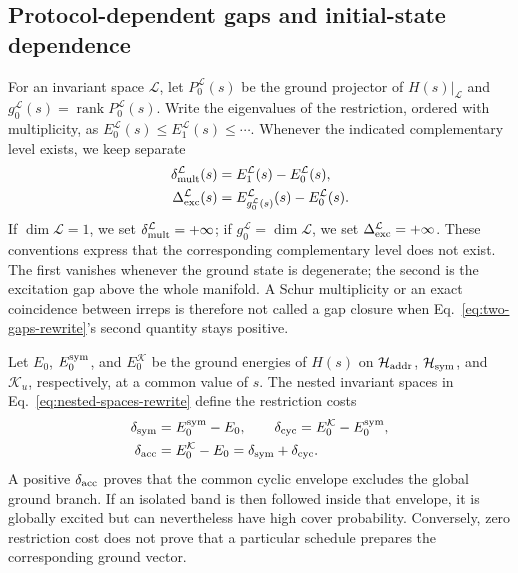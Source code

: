 \subsection{Protocol-dependent gaps and initial-state dependence}
\label{sec:rewrite-gaps}

For an invariant space $\mathcal L$, let $P_0^{\mathcal L}(s)$ be the
ground projector of $H(s)|_{\mathcal L}$ and
$g_0^{\mathcal L}(s)=\operatorname{rank}P_0^{\mathcal L}(s)$.  Write the
eigenvalues of the restriction, ordered with multiplicity, as
$E_0^{\mathcal L}(s)\leq E_1^{\mathcal L}(s)\leq\cdots$.  Whenever the
indicated complementary level exists, we keep separate
\begin{align}
 \delta_{\rm mult}^{\mathcal L}(s)
 &=E_1^{\mathcal L}(s)-E_0^{\mathcal L}(s),\\
 \Delta_{\rm exc}^{\mathcal L}(s)
 &=E_{g_0^{\mathcal L}(s)}^{\mathcal L}(s)-E_0^{\mathcal L}(s).
 \label{eq:two-gaps-rewrite}
\end{align}
If $\dim\mathcal L=1$, we set $\delta_{\rm mult}^{\mathcal L}=+\infty$;
if $g_0^{\mathcal L}=\dim\mathcal L$, we set
$\Delta_{\rm exc}^{\mathcal L}=+\infty$.  These conventions express that
the corresponding complementary level does not exist.
The first vanishes whenever the ground state is degenerate; the second is
the excitation gap above the whole manifold.  A Schur multiplicity or an
exact coincidence between irreps is therefore not called a gap closure when
Eq.~\eqref{eq:two-gaps-rewrite}'s second quantity stays positive.

Let $E_0$, $E_0^{\rm sym}$, and $E_0^{\mathcal K}$ be the ground energies
of $H(s)$ on $\mathcal H_{\rm addr}$, $\mathcal H_{\rm sym}$, and
$\mathcal K_u$, respectively, at a common value of $s$.  The nested
invariant spaces in Eq.~\eqref{eq:nested-spaces-rewrite} define the
restriction costs
\begin{align}
 \delta_{\rm sym}&=E_0^{\rm sym}-E_0,\quad\quad
 \delta_{\rm cyc}=E_0^{\mathcal K}-E_0^{\rm sym},\\
 \delta_{\rm acc}&=E_0^{\mathcal K}-E_0
 =\delta_{\rm sym}+\delta_{\rm cyc}.
 \label{eq:accessibility-cost-rewrite}
\end{align}
A positive $\delta_{\rm acc}$ proves that the common cyclic envelope excludes
the global ground branch.  If an isolated band is then followed inside that
envelope, it is globally excited but can nevertheless have high cover
probability.  Conversely, zero restriction cost does not prove that a
particular schedule prepares the corresponding ground vector.

